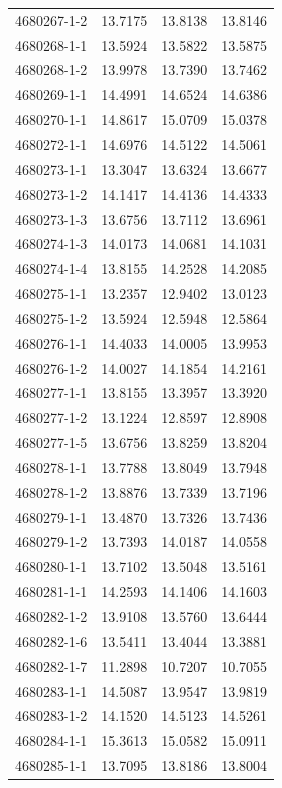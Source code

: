 \begin{longtable}{lrrr}
4680267-1-2 & 13.7175 & 13.8138 & 13.8146 \\
4680268-1-1 & 13.5924 & 13.5822 & 13.5875 \\
4680268-1-2 & 13.9978 & 13.7390 & 13.7462 \\
4680269-1-1 & 14.4991 & 14.6524 & 14.6386 \\
4680270-1-1 & 14.8617 & 15.0709 & 15.0378 \\
4680272-1-1 & 14.6976 & 14.5122 & 14.5061 \\
4680273-1-1 & 13.3047 & 13.6324 & 13.6677 \\
4680273-1-2 & 14.1417 & 14.4136 & 14.4333 \\
4680273-1-3 & 13.6756 & 13.7112 & 13.6961 \\
4680274-1-3 & 14.0173 & 14.0681 & 14.1031 \\
4680274-1-4 & 13.8155 & 14.2528 & 14.2085 \\
4680275-1-1 & 13.2357 & 12.9402 & 13.0123 \\
4680275-1-2 & 13.5924 & 12.5948 & 12.5864 \\
4680276-1-1 & 14.4033 & 14.0005 & 13.9953 \\
4680276-1-2 & 14.0027 & 14.1854 & 14.2161 \\
4680277-1-1 & 13.8155 & 13.3957 & 13.3920 \\
4680277-1-2 & 13.1224 & 12.8597 & 12.8908 \\
4680277-1-5 & 13.6756 & 13.8259 & 13.8204 \\
4680278-1-1 & 13.7788 & 13.8049 & 13.7948 \\
4680278-1-2 & 13.8876 & 13.7339 & 13.7196 \\
4680279-1-1 & 13.4870 & 13.7326 & 13.7436 \\
4680279-1-2 & 13.7393 & 14.0187 & 14.0558 \\
4680280-1-1 & 13.7102 & 13.5048 & 13.5161 \\
4680281-1-1 & 14.2593 & 14.1406 & 14.1603 \\
4680282-1-2 & 13.9108 & 13.5760 & 13.6444 \\
4680282-1-6 & 13.5411 & 13.4044 & 13.3881 \\
4680282-1-7 & 11.2898 & 10.7207 & 10.7055 \\
4680283-1-1 & 14.5087 & 13.9547 & 13.9819 \\
4680283-1-2 & 14.1520 & 14.5123 & 14.5261 \\
4680284-1-1 & 15.3613 & 15.0582 & 15.0911 \\
4680285-1-1 & 13.7095 & 13.8186 & 13.8004 \\

\end{longtable}

